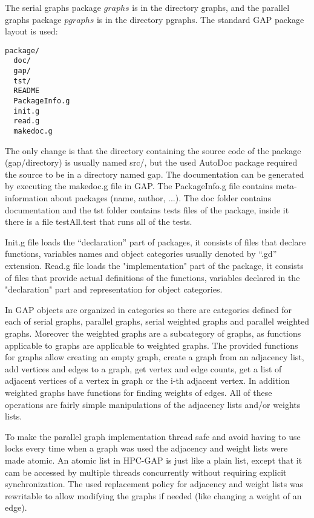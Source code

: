 \documentclass{report}
\theoremstyle{plain}
\theoremstyle{definition}
\theoremstyle{remark}
\begin{document}
The serial graphs package $graphs$ is in the directory graphs, and the parallel graphs package $pgraphs$ is in the directory pgraphs. The standard GAP package layout is used:

\begin{lstlisting}
package/
  doc/
  gap/
  tst/
  README
  PackageInfo.g
  init.g
  read.g
  makedoc.g
\end{lstlisting}

The only change is that the directory containing the source code of the package (gap/directory) is usually named src/, but the used AutoDoc package required the source to be in a directory named gap. The documentation can be generated by executing the makedoc.g file in GAP.
The PackageInfo.g file contains meta-information about packages (name, author, ...). The doc folder contains documentation and the tst folder contains tests files of the package, inside it there is a file testAll.test that runs all of the tests.

Init.g file loads the ``declaration'' part of packages, it consists of files that declare functions, variables names and object categories usually denoted by ``.gd'' extension. Read.g file loads the "implementation" part of the package, it consists of files that provide actual definitions of the functions, variables declared in the "declaration" part and representation for object categories.

In GAP objects are organized in categories so there are categories defined for each of serial graphs, parallel graphs, serial weighted graphs and parallel weighted graphs. Moreover the weighted graphs are a subcategory of graphs, as functions applicable to graphs are applicable to weighted graphs. The provided functions for graphs allow creating an empty graph, create a graph from an adjacency list, add vertices and edges to a graph, get vertex and edge counts, get a list of adjacent vertices of a vertex in graph or the i-th adjacent vertex. In addition weighted graphs have functions for finding weights of edges. All of these operations are fairly simple manipulations of the adjacency lists and/or weights lists.

To make the parallel graph implementation thread safe and avoid having to use locks every time when a graph was used the adjacency and weight lists were made atomic. An atomic list in HPC-GAP is just like a plain list, except that it cam be accessed by multiple threads concurrently without requiring explicit synchronization. The used replacement policy for adjacency and weight lists was rewritable to allow modifying the graphs if needed (like changing a weight of an edge).
\end{document}
